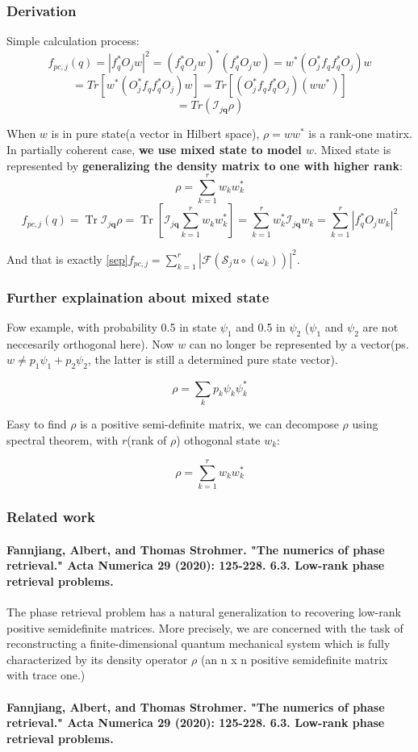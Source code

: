 \documentclass[UTF8]{beamer}
\begin{document}
\begin{frame}\frametitle{Derivation}

 Simple calculation process:
$$
f_{pc,j}(q) = |f_q^*O_j w|^2 = (f_q^*O_j w)^*(f_q^*O_j w) = w^*(O_j^*f_qf_q^*O_j)w
$$
$$
=Tr[w^*(O_j^*f_qf_q^*O_j)w]=Tr[(O_j^*f_qf_q^*O_j) (ww^*)]
$$
$$
=Tr(  \mathcal{I}_{j \mathbf{q}} \rho )
$$


When $w$ is in pure state(a vector in Hilbert space), $\rho=ww^*$ is a rank-one matirx. In partially coherent case, \textbf{we use mixed state to model $w$}.  Mixed state is represented by \textbf{generalizing the density matrix to one with higher rank}: 
$$
\rho = \sum_{k=1}^{r} w_k w_k^*
$$
$$
 f_{pc,j}(q) = \operatorname{Tr} \mathcal{I}_{j \mathbf{q}} \rho
 = \operatorname{Tr}[ \mathcal{I}_{j \mathbf{q}}  \sum_{k=1}^{r} w_k w_k^*]
=
\sum_{k=1}^r w_k^*\mathcal{I}_{j \mathbf{q}} w_k 
=
\sum_{k=1}^r |f_q^*O_j w_k|^2 
$$

And that is exactly \eqref{sep}$
 f_{pc,j}=\sum_{k=1}^r \left|\mathcal{F}\left( \mathcal{S}_{j} u \circ \left(\omega_k\right) \right)\right|^{2}  
$. 
\end{frame}
\begin{frame} \frametitle{Further explaination about mixed state}
 Fow example, with probability 0.5 in state $\psi_1$ and 0.5 in $\psi_2$ ($\psi_1$ and $\psi_2$ are not neccesarily orthogonal here). Now $w$ can no longer be represented by a vector(ps. $w \neq p_1\psi_1 + p_2 \psi_2$, the latter is still a determined pure state vector).
 
 $$
 \rho = \sum_k p_k \psi_k \psi_k^*
 $$
 
 
 
 Easy to find $\rho$ is a positive semi-definite matrix, we can decompose $\rho$ using spectral theorem, with $r$(rank of $\rho$) othogonal state $w_k$:
 
 $$
 \rho = \sum_{k=1}^{r} w_k w_k^*
 $$
 
\end{frame}
\begin{frame} \frametitle{Related work}
\framesubtitle{Fannjiang, Albert, and Thomas Strohmer. "The numerics of phase retrieval." Acta Numerica 29 (2020): 125-228. 6.3. Low-rank phase retrieval problems.}

The phase retrieval problem has a natural
generalization to recovering low-rank positive semidefinite matrices.
More precisely, we are concerned with the task of reconstructing a finite-dimensional quantum mechanical system which is fully characterized
by its density operator $\rho$ (an n x n positive semidefinite matrix with trace one.)
\framesubtitle{Fannjiang, Albert, and Thomas Strohmer. "The numerics of phase retrieval." Acta Numerica 29 (2020): 125-228. 6.3. Low-rank phase retrieval problems.}




\end{frame}
\end{document}

